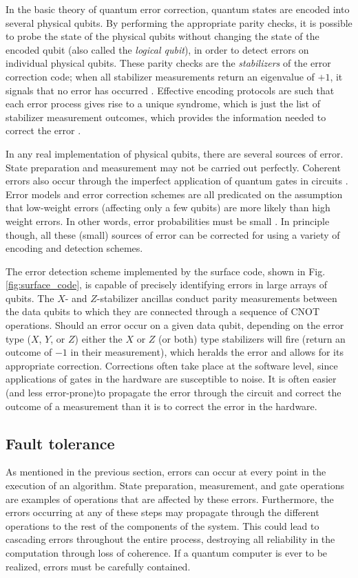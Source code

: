 In the basic theory of quantum error correction, quantum states are encoded into
several physical qubits. By performing the appropriate parity checks, it is
possible to probe the state of the physical qubits without changing the state of
the encoded qubit (also called the \textit{logical qubit}), in order to detect
errors on individual physical qubits. These parity checks are the
\textit{stabilizers} of the error correction code; when all stabilizer
measurements return an eigenvalue of $+1$, it signals that no error has occurred
\cite{nielsen_chuang_2010}. Effective encoding protocols are such that each
error process gives rise to a unique syndrome, which is just the list of
stabilizer measurement outcomes, which provides the information needed to
correct the error \cite{fowler12_surfac_codes}.

In any real implementation of physical qubits, there are several sources of
error. State preparation and measurement may not be carried out perfectly.
Coherent errors also occur through the imperfect application of quantum gates in
circuits \cite{Devitt_2013}. Error models and error correction schemes are all
predicated on the assumption that low-weight errors (affecting only a few
qubits) are more likely than high weight errors. In other words, error
probabilities must be small \cite{terhal15}. In principle though, all these
(small) sources of error can be corrected for using a variety of encoding and
detection schemes.

The error detection scheme implemented by the surface code, shown in Fig.
\ref{fig:surface_code}, is capable of precisely identifying errors in large
arrays of qubits. The $X$- and $Z$-stabilizer ancillas conduct parity
measurements between the data qubits to which they are connected through a
sequence of CNOT operations. Should an error occur on a given data qubit,
depending on the error type ($X$, $Y$, or $Z$) either the $X$ or $Z$ (or both)
type stabilizers will fire (return an outcome of $-1$ in their measurement),
which heralds the error and allows for its appropriate correction. Corrections
often take place at the software level, since applications of gates in the
hardware are susceptible to noise. It is often easier (and less error-prone)to
propagate the error through the circuit and correct the outcome of a measurement
than it is to correct the error in the hardware.

\subsection{Fault tolerance}
As mentioned in the previous section, errors can occur at every point in the
execution of an algorithm. State preparation, measurement, and gate operations
are examples of operations that are affected by these errors. Furthermore, the
errors occurring at any of these steps may propagate through the different
operations to the rest of the components of the system. This could lead to
cascading errors throughout the entire process, destroying all reliability in
the computation through loss of coherence. If a quantum computer is ever to be
realized, errors must be carefully contained.

